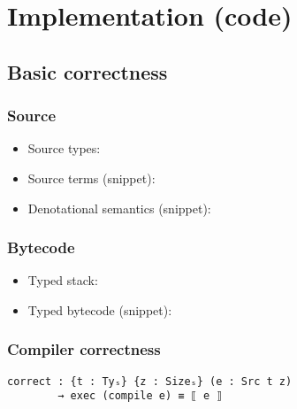 \section{Implementation (code)}

    \subsection{Basic correctness}

        \begin{frame}[fragile]
            \frametitle{Source}

            \begin{itemize}
                \item Source types:

                \item Source terms (snippet):

                \item Denotational semantics (snippet):
            \end{itemize}
\end{frame}

        \begin{frame}[fragile]
            \frametitle{Bytecode}

            \begin{itemize}
                \item Typed stack:

                \item Typed bytecode (snippet):
            \end{itemize}
\end{frame}

        \begin{frame}[fragile]
            \frametitle{Compiler correctness}

            \begin{verbatim}
correct : {t : Tyₛ} {z : Sizeₛ} (e : Src t z)
        → exec (compile e) ≡ ⟦ e ⟧
            \end{verbatim}
\end{frame}


